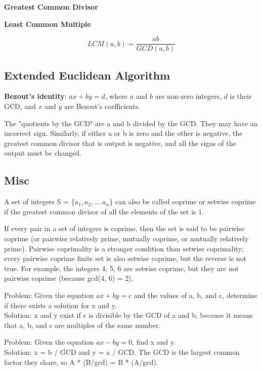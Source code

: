 
\textbf{Greatest Common Divisor}





\textbf{Least Common Multiple}

$$LCM(a, b) = \frac{ab}{GCD(a, b)}$$

\subsection*{Extended Euclidean Algorithm}

\textbf{Bezout's identity}: $ax + by = d$, where $a$ and $b$ are non-zero integers, $d$ is their GCD, and $x$ and $y$ are Bezout's coefficients.



The "quotients by the GCD" are a and b divided by the GCD. They may have an incorrect sign. Similarly, if either a or b is zero and the other is negative, the greatest common divisor that is output is negative, and all the signs of the output must be changed.

\subsection*{Misc}

A set of integers S = \{$a_1, a_2, .... a_n$\} can also be called coprime or setwise coprime if the greatest common divisor of all the elements of the set is 1.

If every pair in a set of integers is coprime, then the set is said to be pairwise coprime (or pairwise relatively prime, mutually coprime, or mutually relatively prime). Pairwise coprimality is a stronger condition than setwise coprimality; every pairwise coprime finite set is also setwise coprime, but the reverse is not true. For example, the integers 4, 5, 6 are setwise coprime, but they are not pairwise coprime (because gcd(4, 6) = 2).

Problem: Given the equation $ax + by = c$ and the values of a, b, and c, determine if there exists a solution for x and y. \\
\indent Solution: x and y exist if c is divisible by the GCD of a and b, because it means that a, b, and c are multiples of the same number.

Problem: Given the equation $ax - by = 0$, find x and y. \\
\indent Solution: x = b / GCD and y = a / GCD. The GCD is the largest common factor they share, so A * (B/gcd) = B * (A/gcd).

\newpage